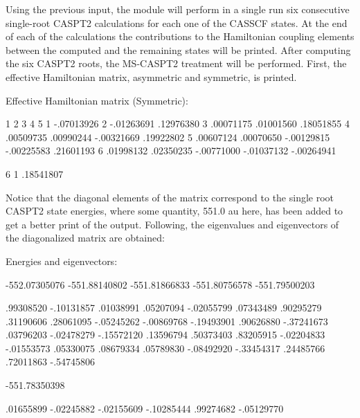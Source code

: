 Using the previous input, the  module will perform in a single
run six consecutive single-root CASPT2 calculations for each one of the CASSCF
states. At the end of each of the calculations the contributions to the Hamiltonian 
coupling elements between the computed and the remaining states will be printed.
After computing the six CASPT2 roots, the MS-CASPT2 treatment will be performed.
First, the effective Hamiltonian matrix, asymmetric and symmetric, is printed.
\begin{sourcelisting}
  Effective Hamiltonian matrix (Symmetric):


                1		 2	        3		4	        5
  1	   -.07013926
  2	   -.01263691	    .12976380
  3	    .00071175	    .01001560	    .18051855
  4	    .00509735	    .00990244	   -.00321669	    .19922802
  5	    .00607124	    .00070650	   -.00129815	   -.00225583	    .21601193
  6	    .01998132	    .02350235	   -.00771000	   -.01037132	   -.00264941

                6
  1	    .18541807
\end{sourcelisting}

Notice that the diagonal elements of the matrix correspond to the single root
CASPT2 state energies, where some quantity, 551.0 au here, has been added to get a 
better print of the output. Following, the eigenvalues and eigenvectors of the
diagonalized matrix are obtained:

\begin{sourcelisting}
  Energies and eigenvectors:

    -552.07305076  -551.88140802  -551.81866833  -551.80756578  -551.79500203

        .99308520     -.10131857      .01038991      .05207094     -.02055799
        .07343489      .90295279      .31190606      .28061095     -.05245262
       -.00869768     -.19493901      .90626880     -.37241673      .03796203
       -.02478279     -.15572120      .13596794      .50373403      .83205915
       -.02204833     -.01553573      .05330075      .08679334      .05789830
       -.08492920     -.33454317      .24485766      .72011863     -.54745806

    -551.78350398

        .01655899
       -.02245882
       -.02155609
       -.10285444
        .99274682
       -.05129770
\end{sourcelisting}

